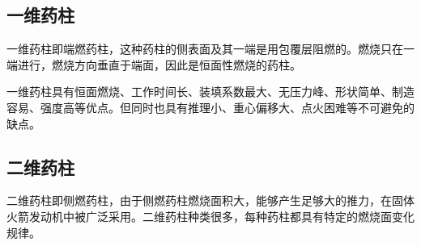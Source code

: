 \subsection{一维药柱}

一维药柱即端燃药柱，这种药柱的侧表面及其一端是用包覆层阻燃的。燃烧只在一端进行，燃烧方向垂直于端面，因此是恒面性燃烧的药柱。

一维药柱具有恒面燃烧、工作时间长、装填系数最大、无压力峰、形状简单、制造容易、强度高等优点。但同时也具有推理小、重心偏移大、点火困难等不可避免的缺点。

\subsection{二维药柱}

二维药柱即侧燃药柱，由于侧燃药柱燃烧面积大，能够产生足够大的推力，在固体火箭发动机中被广泛采用。二维药柱种类很多，每种药柱都具有特定的燃烧面变化规律。

